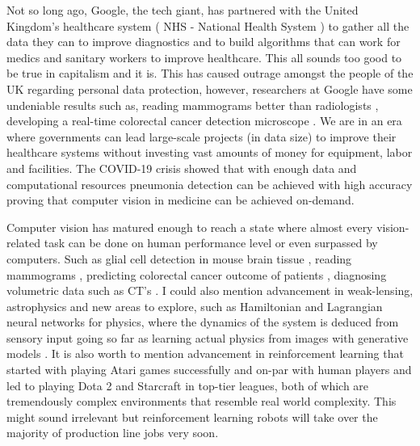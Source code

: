 \documentclass[a4paper,12pt]{article}
\begin{document}
\vspace{4mm}

\par Not so long ago, Google, the tech giant, has partnered with the United Kingdom's healthcare system ( NHS - National Health System ) to gather all the data they can to improve diagnostics and to build algorithms that can work for medics and sanitary workers to improve healthcare. This all sounds too good to be true in capitalism and it is. This has caused outrage amongst the people of the UK \cite{kollewe_2019} regarding personal data protection, however, researchers at Google have some undeniable results such as, reading mammograms better than radiologists \cite{mckinney2020international}, developing a real-time colorectal cancer detection microscope \cite{chen2019augmented}. We are in an era where governments can lead large-scale projects (in data size) to improve their healthcare systems without investing vast amounts of money for equipment, labor and facilities. The COVID-19 crisis showed that with enough data and computational resources pneumonia detection can be achieved with high accuracy \cite{nvidia} proving that computer vision in medicine can be achieved on-demand.

\vspace{4mm}

\par Computer vision has matured enough to reach a state where almost every vision-related task can be done on human performance level or even surpassed by computers. Such as glial cell detection in mouse brain tissue \cite{suleymanova2018deep}, reading mammograms  \cite{ribli2018detecting}, 
predicting colorectal cancer outcome of patients \cite{skrede2020deep}, diagnosing volumetric data such as CT's \cite{cciccek20163d}. I could also mention advancement in weak-lensing, astrophysics \cite{ribli2019improved} and new areas to explore, such as Hamiltonian \cite{greydanus2019hamiltonian} and Lagrangian \cite{cranmer2020lagrangian} neural networks for physics, where the dynamics of the system is deduced from sensory input going so far as learning actual physics from images with generative models \cite{toth2019hamiltonian}. It is also worth to mention advancement in reinforcement learning that started with playing Atari games \cite{mnih2013playing} successfully and on-par with human players and led to playing Dota 2 and Starcraft \cite{alphastarblog} in top-tier leagues, both of which are tremendously complex environments that resemble real world complexity. This might sound irrelevant but reinforcement learning robots will take over the majority of production line jobs \cite{satariano_metz_2020} very soon.
\end{document}
